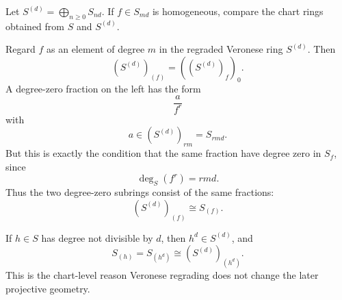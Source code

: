 \begin{problem}\label{prob:vi34-16}
Let \(S^{(d)}=\bigoplus_{n\ge0}S_{nd}\). If \(f\in S_{md}\) is homogeneous, compare the chart rings obtained from
\(S\) and \(S^{(d)}\).

\end{problem}

\ifdefined\FullProblemDossiers
\begin{solution}
Regard \(f\) as an element of degree \(m\) in the regraded Veronese ring \(S^{(d)}\). Then
\[
(S^{(d)})_{(f)}
=
\left((S^{(d)})_f\right)_0.
\]
A degree-zero fraction on the left has the form
\[
\frac a{f^r}
\]
with
\[
a\in(S^{(d)})_{rm}=S_{rmd}.
\]
But this is exactly the condition that the same fraction have degree zero in \(S_f\), since
\[
\deg_S(f^r)=rmd.
\]
Thus the two degree-zero subrings consist of the same fractions:
\[
\boxed{
(S^{(d)})_{(f)}\cong S_{(f)}.
}
\]

If \(h\in S\) has degree not divisible by \(d\), then \(h^d\in S^{(d)}\), and
\[
S_{(h)}=S_{(h^d)}\cong(S^{(d)})_{(h^d)}.
\]
This is the chart-level reason Veronese regrading does not change the later projective geometry.
\end{solution}
\fi
